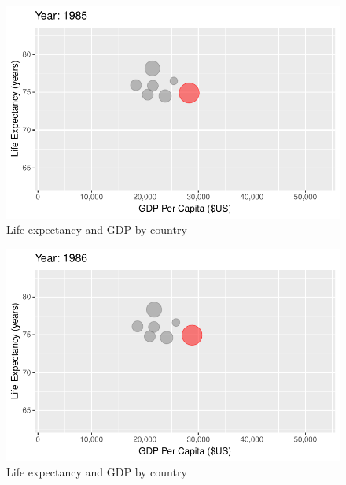\documentclass[
  letterpaper,
  DIV=11,
  numbers=noendperiod]{scrreport}
\theoremstyle{definition}
\theoremstyle{remark}
\begin{document}
\begin{figure}

{\centering \includegraphics{index_files/figure-pdf/fig-anim-country-61.pdf}

}

\caption{\label{fig-anim-country-61}Life expectancy and GDP by country}

\end{figure}

\begin{figure}

{\centering \includegraphics{index_files/figure-pdf/fig-anim-country-62.pdf}

}

\caption{\label{fig-anim-country-62}Life expectancy and GDP by country}

\end{figure}
\end{document}
